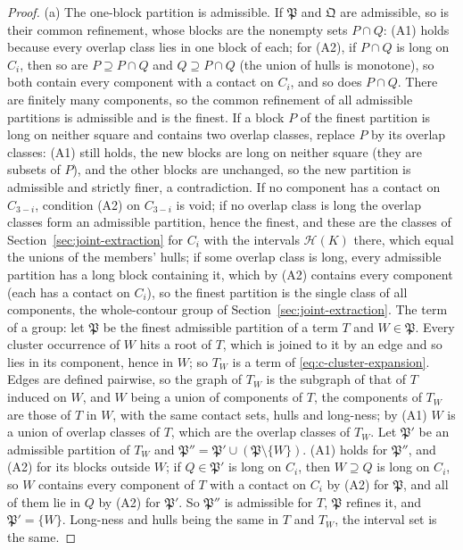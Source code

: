 \begin{proof}
(a) The one-block partition is admissible. If $\mathfrak P$ and $\mathfrak Q$ are admissible, so is their common refinement, whose blocks are the nonempty sets $P\cap Q$: (A1) holds because every overlap class lies in one block of each; for (A2), if $P\cap Q$ is long on $C_i$, then so are $P\supseteq P\cap Q$ and $Q\supseteq P\cap Q$ (the union of hulls is monotone), so both contain every component with a contact on $C_i$, and so does $P\cap Q$. There are finitely many components, so the common refinement of all admissible partitions is admissible and is the finest. If a block $P$ of the finest partition is long on neither square and contains two overlap classes, replace $P$ by its overlap classes: (A1) still holds, the new blocks are long on neither square (they are subsets of $P$), and the other blocks are unchanged, so the new partition is admissible and strictly finer, a contradiction. If no component has a contact on $C_{3-i}$, condition (A2) on $C_{3-i}$ is void; if no overlap class is long the overlap classes form an admissible partition, hence the finest, and these are the classes of Section~\ref{sec:joint-extraction} for $C_i$ with the intervals $\mathcal H(K)$ there, which equal the unions of the members' hulls; if some overlap class is long, every admissible partition has a long block containing it, which by (A2) contains every component (each has a contact on $C_i$), so the finest partition is the single class of all components, the whole-contour group of Section~\ref{sec:joint-extraction}. The term of a group: let $\mathfrak P$ be the finest admissible partition of a term $T$ and $W\in\mathfrak P$. Every cluster occurrence of $W$ hits a root of $T$, which is joined to it by an edge and so lies in its component, hence in $W$; so $T_W$ is a term of \eqref{eq:c-cluster-expansion}. Edges are defined pairwise, so the graph of $T_W$ is the subgraph of that of $T$ induced on $W$, and $W$ being a union of components of $T$, the components of $T_W$ are those of $T$ in $W$, with the same contact sets, hulls and long-ness; by (A1) $W$ is a union of overlap classes of $T$, which are the overlap classes of $T_W$. Let $\mathfrak P'$ be an admissible partition of $T_W$ and $\mathfrak P''=\mathfrak P'\cup(\mathfrak P\setminus\{W\})$. (A1) holds for $\mathfrak P''$, and (A2) for its blocks outside $W$; if $Q\in\mathfrak P'$ is long on $C_i$, then $W\supseteq Q$ is long on $C_i$, so $W$ contains every component of $T$ with a contact on $C_i$ by (A2) for $\mathfrak P$, and all of them lie in $Q$ by (A2) for $\mathfrak P'$. So $\mathfrak P''$ is admissible for $T$, $\mathfrak P$ refines it, and $\mathfrak P'=\{W\}$. Long-ness and hulls being the same in $T$ and $T_W$, the interval set is the same.


\end{proof}
